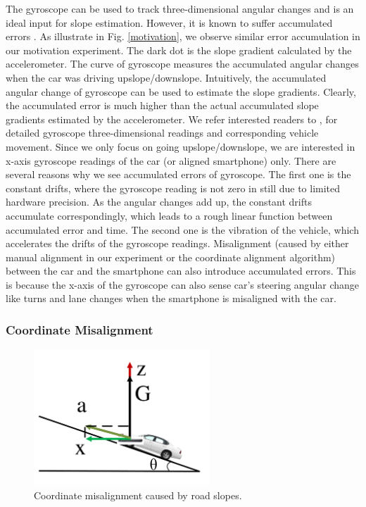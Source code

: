 The gyroscope can be used to track three-dimensional angular changes
and is an ideal input for slope estimation. 
However, it is known to suffer accumulated errors \cite{zhou2014use}. 
As illustrate in Fig. \ref{motivation}, 
we observe similar error accumulation in our motivation experiment. 
The dark dot is the slope gradient calculated by the accelerometer.
The curve of gyroscope measures the accumulated angular changes  
when the car was driving upslope/downslope.
Intuitively, the accumulated angular change of gyroscope can be used to 
estimate the slope gradients.
Clearly, the accumulated error is much higher than 
the actual accumulated slope gradients estimated by the accelerometer. 
We refer interested readers to \cite{chen2015invisible, zhou2014use},  
for detailed gyroscope three-dimensional readings 
and corresponding vehicle movement. 
Since we only focus on going upslope/downslope, we are interested in 
x-axis gyroscope readings of the car (or aligned smartphone) only.
There are several reasons why we see accumulated errors of gyroscope. 
The first one is the constant drifts, where the gyroscope reading is 
not zero in still due to limited hardware precision.
As the angular changes add up, the constant drifts accumulate correspondingly, 
which leads to a rough linear function between accumulated error and time.
The second one is the vibration of the vehicle, which accelerates
the drifts of the gyroscope readings.
Misalignment (caused by either manual alignment in our experiment 
or the coordinate alignment algorithm) between the car and the smartphone can also introduce accumulated errors. 
This is because the x-axis of the gyroscope can also sense car's steering angular change like turns and lane changes
when the smartphone is misaligned with the car.

\subsubsection{Coordinate Misalignment}

\begin{figure}[!htbp]
\begin{center}
  \vspace{-0.2cm}
  \includegraphics[width=2.6in, angle=0]{Figs/DriveSense/slopeaware/misalignment.pdf}
\vspace{-0.2cm}
\caption{Coordinate misalignment caused by road slopes.}
  \label{slopemisalignment}
\vspace{-0.4cm}
\end{center}
\end{figure}

